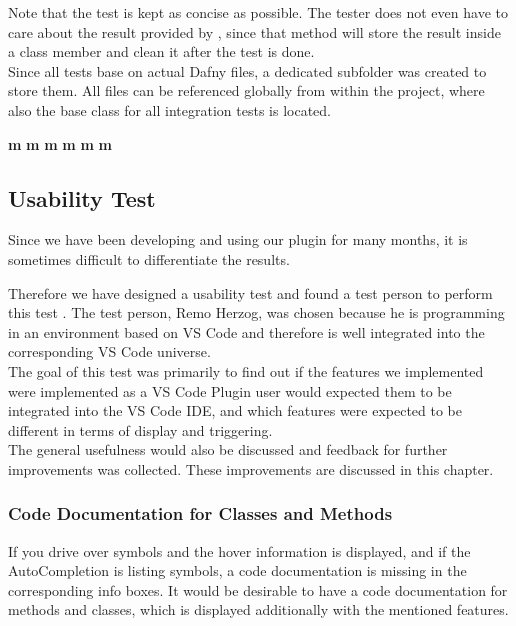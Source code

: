 Note that the test is kept as concise as possible.
The tester does not even have to care about the result provided by , since that method will store the result inside a class member and clean it after the test is done.\\

Since all tests base on actual Dafny files, a dedicated subfolder was created to store them.
All files can be referenced globally from within the  project, where also the base class for all integration tests is located.



\textbf{m}
\textbf{m}
\textbf{m}
\textbf{m}
\textbf{m}
\textbf{m}


\subsection{Usability Test}
Since we have been developing and using our plugin for many months,
it is sometimes difficult to differentiate the results.

Therefore we have designed a usability test and found a test person to perform this test \cite{interview-remo}.
The test person, Remo Herzog, was chosen because he is programming in an environment based on VS Code
and therefore is well integrated into the corresponding VS Code universe. \\

The goal of this test was primarily to find out if the features
we implemented were implemented as a VS Code Plugin user would expected them to be integrated into the VS Code IDE,
and which features were expected to be different in terms of display and triggering. \\

The general usefulness would also be discussed and feedback for further improvements was collected.
These improvements are discussed in this chapter.

\subsubsection{Code Documentation for Classes and Methods}
If you drive over symbols and the hover information is displayed,
and if the AutoCompletion is listing symbols,
a code documentation is missing in the corresponding info boxes.
It would be desirable to have a code documentation for methods and classes,
which is displayed additionally with the mentioned features. \\

